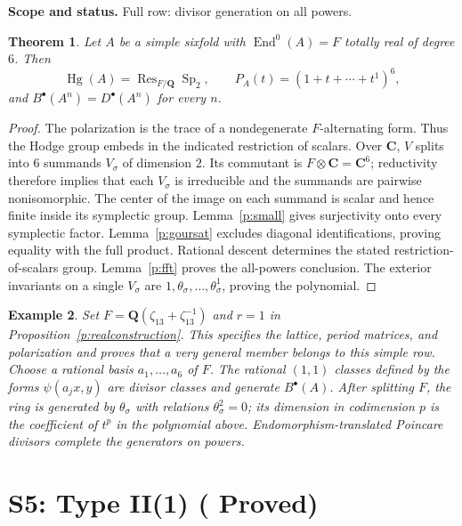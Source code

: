 \documentclass[10pt,reqno]{article}
\theoremstyle{emphasizedplain}
\DeclareRobustCommand{\provedstatus}{%
  \texorpdfstring{\textcolor{ProvedGreen}{\textbf{Proved}}}{Proved}}
\newtheorem{theorem}{Theorem}[section]
\theoremstyle{emphasizeddefinition}
\newtheorem{example}[theorem]{Example}
\theoremstyle{emphasizeddefinition}
\DeclareMathOperator{\End}{End}
\DeclareMathOperator{\Hg}{Hg}
\DeclareMathOperator{\Sp}{Sp}
\DeclareMathOperator{\Res}{Res}
\newcommand{\Q}{\mathbf Q}
\newcommand{\C}{\mathbf C}
\newcommand{\B}{B}
\newcommand{\D}{D}
\newcommand{\status}[1]{%
  \par\nobreak\smallskip\noindent
  {\setlength{\fboxsep}{7pt}%
   \colorbox{ScopeBackground}{%
    \parbox{\dimexpr\linewidth-2\fboxsep\relax}{%
     \small\textbf{\textcolor{HeadingInk}{Scope and status.}} #1}}}%
  \par\nobreak\medskip}
\renewcommand{\small}{\fontsize{8.4}{10}\selectfont}
\begin{document}
\status{Full row: divisor generation on all powers.}
\begin{theorem}
Let $A$ be a simple sixfold with $\End^0(A)=F$ totally real of degree $6$.
Then
\[
 \Hg(A)=\Res_{F/\Q}\Sp_{2},\qquad
 P_A(t)=(1+t+\cdots+t^{1})^{6},
\]
and $\B^\bullet(A^n)=\D^\bullet(A^n)$ for every $n$.
\end{theorem}
\begin{proof}
The polarization is the trace of a nondegenerate $F$-alternating form.
Thus the Hodge group embeds in the indicated restriction of scalars.
Over $\C$, $V$ splits into $6$ summands $V_\sigma$ of dimension $2$.
Its commutant is $F\otimes\C=\C^{6}$; reductivity therefore implies that
each $V_\sigma$ is irreducible and the summands are pairwise nonisomorphic.
The center of the image on each summand is scalar and hence finite inside
its symplectic group. Lemma~\ref{p:small} gives surjectivity onto every
symplectic factor. Lemma~\ref{p:goursat} excludes diagonal identifications,
proving equality with the full product. Rational descent determines the
stated restriction-of-scalars group. Lemma~\ref{p:fft} proves the all-powers
conclusion. The exterior invariants on a single $V_\sigma$ are
$1,\theta_\sigma,\ldots,\theta_\sigma^{1}$, proving the polynomial.
\end{proof}
\begin{example}
Set $F=\Q(\zeta_{13}+\zeta_{13}^{-1})$ and $r=1$ in
Proposition~\ref{p:realconstruction}. This specifies the lattice, period
matrices, and polarization and proves that a very general member belongs
to this simple row. Choose a rational basis $a_1,\ldots,a_{6}$ of $F$.
The rational $(1,1)$ classes defined by the forms
$\psi(a_jx,y)$ are divisor classes and generate $\B^\bullet(A)$.
After splitting $F$, the ring is generated by $\theta_\sigma$ with
relations $\theta_\sigma^{2}=0$; its dimension in codimension $p$ is the
coefficient of $t^p$ in the polynomial above. Endomorphism-translated
Poincare divisors complete the generators on powers.
\end{example}
\section{S5: Type II(1) (\provedstatus)}\label{sec:S5}
\end{document}
